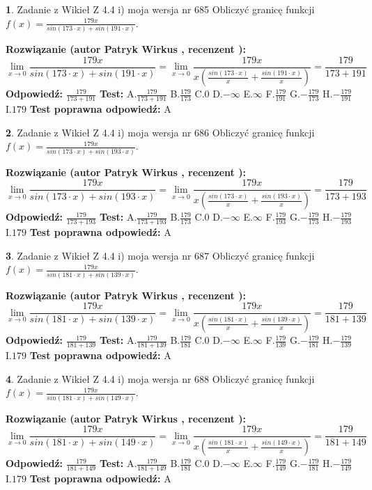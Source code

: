 \documentclass[12pt, a4paper]{article}
\theoremstyle{definition} %
\newtheorem{zad}{}
\newcommand{\zadStart}[1]{\begin{zad}#1\newline}
\newcommand{\zadStop}{\end{zad}}
\newcommand{\rozwStart}[2]{\noindent \textbf{Rozwiązanie (autor #1 , recenzent #2): }\newline}
\newcommand{\rozwStop}{\newline}
\newcommand{\odpStart}{\noindent \textbf{Odpowiedź:}\newline}
\newcommand{\odpStop}{\newline}
\newcommand{\testStart}{\noindent \textbf{Test:}\newline}
\newcommand{\testStop}{\newline}
\newcommand{\kluczStart}{\noindent \textbf{Test poprawna odpowiedź:}\newline}
\newcommand{\kluczStop}{\newline}
\begin{document}
\zadStart{Zadanie z Wikieł Z 4.4 i) moja wersja nr 685}
Obliczyć granicę funkcji $f(x)=\frac{179x}{sin(173\cdot x) +sin(191\cdot x)}$.
\zadStop
\rozwStart{Patryk Wirkus}{}
$$\lim\limits_{x\to 0}\frac{179x}{sin(173\cdot x) +sin(191\cdot x)}=\lim\limits_{x\to 0}\frac{179x}{x(\frac{sin(173\cdot x)}{x}+\frac{sin(191\cdot x)}{x})}=\frac{179}{173+191}$$
\rozwStop
\odpStart
$\frac{179}{173+191}$
\odpStop
\testStart
A.$\frac{179}{173+191}$
B.$\frac{179}{173}$
C.$0$
D.$-\infty$
E.$\infty$
F.$\frac{179}{191}$
G.$-\frac{179}{173}$
H.$-\frac{179}{191}$
I.$179$
\testStop
\kluczStart
A
\kluczStop



\zadStart{Zadanie z Wikieł Z 4.4 i) moja wersja nr 686}
Obliczyć granicę funkcji $f(x)=\frac{179x}{sin(173\cdot x) +sin(193\cdot x)}$.
\zadStop
\rozwStart{Patryk Wirkus}{}
$$\lim\limits_{x\to 0}\frac{179x}{sin(173\cdot x) +sin(193\cdot x)}=\lim\limits_{x\to 0}\frac{179x}{x(\frac{sin(173\cdot x)}{x}+\frac{sin(193\cdot x)}{x})}=\frac{179}{173+193}$$
\rozwStop
\odpStart
$\frac{179}{173+193}$
\odpStop
\testStart
A.$\frac{179}{173+193}$
B.$\frac{179}{173}$
C.$0$
D.$-\infty$
E.$\infty$
F.$\frac{179}{193}$
G.$-\frac{179}{173}$
H.$-\frac{179}{193}$
I.$179$
\testStop
\kluczStart
A
\kluczStop



\zadStart{Zadanie z Wikieł Z 4.4 i) moja wersja nr 687}
Obliczyć granicę funkcji $f(x)=\frac{179x}{sin(181\cdot x) +sin(139\cdot x)}$.
\zadStop
\rozwStart{Patryk Wirkus}{}
$$\lim\limits_{x\to 0}\frac{179x}{sin(181\cdot x) +sin(139\cdot x)}=\lim\limits_{x\to 0}\frac{179x}{x(\frac{sin(181\cdot x)}{x}+\frac{sin(139\cdot x)}{x})}=\frac{179}{181+139}$$
\rozwStop
\odpStart
$\frac{179}{181+139}$
\odpStop
\testStart
A.$\frac{179}{181+139}$
B.$\frac{179}{181}$
C.$0$
D.$-\infty$
E.$\infty$
F.$\frac{179}{139}$
G.$-\frac{179}{181}$
H.$-\frac{179}{139}$
I.$179$
\testStop
\kluczStart
A
\kluczStop



\zadStart{Zadanie z Wikieł Z 4.4 i) moja wersja nr 688}
Obliczyć granicę funkcji $f(x)=\frac{179x}{sin(181\cdot x) +sin(149\cdot x)}$.
\zadStop
\rozwStart{Patryk Wirkus}{}
$$\lim\limits_{x\to 0}\frac{179x}{sin(181\cdot x) +sin(149\cdot x)}=\lim\limits_{x\to 0}\frac{179x}{x(\frac{sin(181\cdot x)}{x}+\frac{sin(149\cdot x)}{x})}=\frac{179}{181+149}$$
\rozwStop
\odpStart
$\frac{179}{181+149}$
\odpStop
\testStart
A.$\frac{179}{181+149}$
B.$\frac{179}{181}$
C.$0$
D.$-\infty$
E.$\infty$
F.$\frac{179}{149}$
G.$-\frac{179}{181}$
H.$-\frac{179}{149}$
I.$179$
\testStop
\kluczStart
A
\kluczStop
\end{document}
